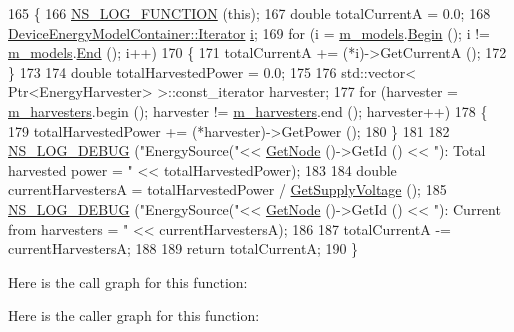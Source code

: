 \begin{DoxyCode}
165 \{
166   \hyperlink{log-macros-disabled_8h_a90b90d5bad1f39cb1b64923ea94c0761}{NS\_LOG\_FUNCTION} (\textcolor{keyword}{this});
167   \textcolor{keywordtype}{double} totalCurrentA = 0.0;
168   \hyperlink{classns3_1_1DeviceEnergyModelContainer_a7e8b57fa36903db5c468cc8a8e00af3b}{DeviceEnergyModelContainer::Iterator} \hyperlink{bernuolliDistribution_8m_a6f6ccfcf58b31cb6412107d9d5281426}{i};
169   \textcolor{keywordflow}{for} (i = \hyperlink{classns3_1_1EnergySource_a82cef6362500415c287d0193ea136c5b}{m\_models}.\hyperlink{classns3_1_1DeviceEnergyModelContainer_a4fe48a4bd94d73c3e8966771a4c23b11}{Begin} (); i != \hyperlink{classns3_1_1EnergySource_a82cef6362500415c287d0193ea136c5b}{m\_models}.\hyperlink{classns3_1_1DeviceEnergyModelContainer_a2cedd9f88ba5587150d09d1e230cd4be}{End} (); i++)
170     \{
171       totalCurrentA += (*i)->GetCurrentA ();
172     \}
173   
174   \textcolor{keywordtype}{double} totalHarvestedPower = 0.0;
175   
176   std::vector< Ptr<EnergyHarvester> >::const\_iterator harvester;
177   \textcolor{keywordflow}{for} (harvester = \hyperlink{classns3_1_1EnergySource_a691b18205f260bcd09fc09fedb4eca8d}{m\_harvesters}.begin (); harvester != \hyperlink{classns3_1_1EnergySource_a691b18205f260bcd09fc09fedb4eca8d}{m\_harvesters}.end (); 
      harvester++)
178   \{
179     totalHarvestedPower += (*harvester)->GetPower ();
180   \}
181   
182   \hyperlink{group__logging_ga413f1886406d49f59a6a0a89b77b4d0a}{NS\_LOG\_DEBUG} (\textcolor{stringliteral}{"EnergySource("}<< \hyperlink{classns3_1_1EnergySource_acac258882d8c38efa49d1f6053eb97ae}{GetNode} ()->GetId () << \textcolor{stringliteral}{"): Total harvested power = "} 
      << totalHarvestedPower);
183 
184   \textcolor{keywordtype}{double} currentHarvestersA = totalHarvestedPower / \hyperlink{classns3_1_1EnergySource_a834c547d15a1e5a5295d833c7d542177}{GetSupplyVoltage} ();
185   \hyperlink{group__logging_ga413f1886406d49f59a6a0a89b77b4d0a}{NS\_LOG\_DEBUG} (\textcolor{stringliteral}{"EnergySource("}<< \hyperlink{classns3_1_1EnergySource_acac258882d8c38efa49d1f6053eb97ae}{GetNode} ()->GetId () << \textcolor{stringliteral}{"): Current from harvesters = 
      "} << currentHarvestersA);
186   
187   totalCurrentA -= currentHarvestersA;
188   
189   \textcolor{keywordflow}{return} totalCurrentA;
190 \}
\end{DoxyCode}


Here is the call graph for this function\+:




Here is the caller graph for this function\+:


